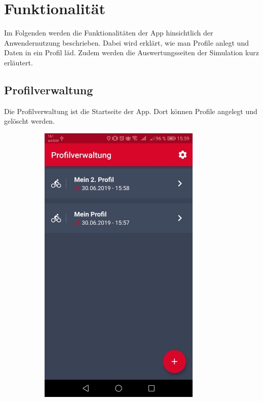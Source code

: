 \chapter{Funktionalität}
\label{chap:funk}
Im Folgenden werden die Funktionalitäten der App hinsichtlich der Anwendernutzung beschrieben. Dabei wird erklärt, wie man Profile anlegt und Daten in ein Profil läd. Zudem werden die Auswertungsseiten der Simulation kurz erläutert. 
	\section{Profilverwaltung}
	\label{sec:profile}
	
	Die Profilverwaltung ist die Startseite der App. Dort können Profile angelegt und gelöscht werden.	
	
	\begin{figure}[H]
		\centering
		\begin{subfigure}[b]{0.45\textwidth}
			\centering
			\includegraphics[width=0.85\textwidth]{../include/images/funktionalitaet/profil}

\end{subfigure}
\end{figure}

